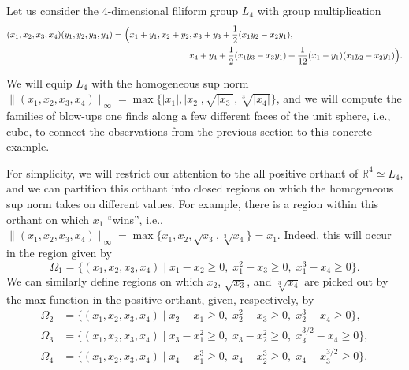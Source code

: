 \documentclass{article}
\theoremstyle{definition}
\newcommand{\norm}[1]{\|#1\|}
\newcommand{\R}{{\mathbb R}}
\begin{document}

Let us consider the 4-dimensional filiform group $L_4$ with group multiplication
\begin{align*}(x_1,x_2,x_3,x_4)(y_1,y_2,y_3,y_4) = \Bigl( x_1+y_1, x_2+y_2&, x_3+y_3+\frac12(x_1y_2 - x_2y_1), \\
& x_4 + y_4 +\frac12(x_1y_3-x_3y_1)+ \frac1{12}(x_1-y_1)(x_1y_2-x_2y_1)\Bigr).
\end{align*}

We will equip $L_4$ with the homogeneous sup norm $\norm{(x_1,x_2,x_3,x_4)}_\infty = \max\{|x_1|, |x_2|, \sqrt{|x_3|}, \sqrt[3]{|x_4|}\}$, and we will compute the families of blow-ups one finds along a few different faces of the unit sphere, i.e., cube, to connect the observations from the previous section to this concrete example.

For simplicity, we will restrict our attention to the all positive orthant of $\R^4 \simeq L_4$, and we can partition this orthant into closed regions on which the homogeneous sup norm takes on different values. For example, there is a region within this orthant on which $x_1$ ``wins'', i.e., $\norm{(x_1,x_2,x_3,x_4)}_\infty = \max\{x_1, x_2, \sqrt{x_3}, \sqrt[3]{x_4}\} = x_1$. Indeed, this will occur in the region given by
\[
\Omega_1 = \{(x_1,x_2,x_3,x_4) \mid x_1 - x_2 \geq 0, \; x_1^2 - x_3 \geq 0,\; x_1^3 - x_4 \geq 0 \}.
\]
We can similarly define regions on which $x_2$, $\sqrt{x_3}$, and $\sqrt[3]{x_4}$ are picked out by the max function in the positive orthant, given, respectively, by
\begin{align*}
\Omega_2 &= \{(x_1,x_2,x_3,x_4) \mid x_2 - x_1 \geq 0, \; x_2^2 - x_3 \geq 0, \; x_2^3 - x_4 \geq 0 \},\\
\Omega_3 &= \{(x_1,x_2,x_3,x_4) \mid x_3 - x_1^2 \geq 0, \; x_3 - x_2^2 \geq 0, \; x_3^{3/2} - x_4 \geq 0 \},\\
\Omega_4 &= \{(x_1,x_2,x_3,x_4) \mid x_4 - x_1^3 \geq 0, \; x_4 - x_2^3 \geq 0,\;  x_4- x_3^{3/2} \geq 0 \}.
\end{align*}
\end{document}
